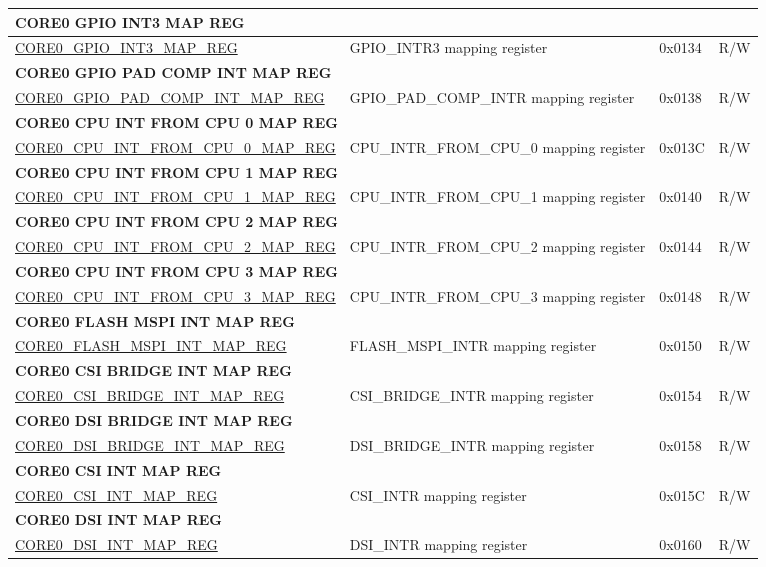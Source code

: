 \begin{longtable}{ | p{7.5cm} | p{7.2cm} | p{1.3cm} | p{1cm} | }
\multicolumn{4}{|l|}{\textbf{CORE0 GPIO INT3 MAP REG}} \\ \hline
\hyperref[regdesc:CORE0GPIOINT3MAPREG]{CORE0\_GPIO\_INT3\_MAP\_REG} & GPIO\_INTR3 mapping register & 0x0134 & R/W \\ \hline
\multicolumn{4}{|l|}{\textbf{CORE0 GPIO PAD COMP INT MAP REG}} \\ \hline
\hyperref[regdesc:CORE0GPIOPADCOMPINTMAPREG]{CORE0\_GPIO\_PAD\_COMP\_INT\_MAP\_REG} & GPIO\_PAD\_COMP\_INTR mapping register & 0x0138 & R/W \\ \hline
\multicolumn{4}{|l|}{\textbf{CORE0 CPU INT FROM CPU 0 MAP REG}} \\ \hline
\hyperref[regdesc:CORE0CPUINTFROMCPU0MAPREG]{CORE0\_CPU\_INT\_FROM\_CPU\_0\_MAP\_REG} & CPU\_INTR\_FROM\_CPU\_0 mapping register & 0x013C & R/W \\ \hline
\multicolumn{4}{|l|}{\textbf{CORE0 CPU INT FROM CPU 1 MAP REG}} \\ \hline
\hyperref[regdesc:CORE0CPUINTFROMCPU1MAPREG]{CORE0\_CPU\_INT\_FROM\_CPU\_1\_MAP\_REG} & CPU\_INTR\_FROM\_CPU\_1 mapping register & 0x0140 & R/W \\ \hline
\multicolumn{4}{|l|}{\textbf{CORE0 CPU INT FROM CPU 2 MAP REG}} \\ \hline
\hyperref[regdesc:CORE0CPUINTFROMCPU2MAPREG]{CORE0\_CPU\_INT\_FROM\_CPU\_2\_MAP\_REG} & CPU\_INTR\_FROM\_CPU\_2 mapping register & 0x0144 & R/W \\ \hline
\multicolumn{4}{|l|}{\textbf{CORE0 CPU INT FROM CPU 3 MAP REG}} \\ \hline
\hyperref[regdesc:CORE0CPUINTFROMCPU3MAPREG]{CORE0\_CPU\_INT\_FROM\_CPU\_3\_MAP\_REG} & CPU\_INTR\_FROM\_CPU\_3 mapping register & 0x0148 & R/W \\ \hline
\multicolumn{4}{|l|}{\textbf{CORE0 FLASH MSPI INT MAP REG}} \\ \hline
\hyperref[regdesc:CORE0FLASHMSPIINTMAPREG]{CORE0\_FLASH\_MSPI\_INT\_MAP\_REG} & FLASH\_MSPI\_INTR mapping register & 0x0150 & R/W \\ \hline
\multicolumn{4}{|l|}{\textbf{CORE0 CSI BRIDGE INT MAP REG}} \\ \hline
\hyperref[regdesc:CORE0CSIBRIDGEINTMAPREG]{CORE0\_CSI\_BRIDGE\_INT\_MAP\_REG} & CSI\_BRIDGE\_INTR mapping register & 0x0154 & R/W \\ \hline
\multicolumn{4}{|l|}{\textbf{CORE0 DSI BRIDGE INT MAP REG}} \\ \hline
\hyperref[regdesc:CORE0DSIBRIDGEINTMAPREG]{CORE0\_DSI\_BRIDGE\_INT\_MAP\_REG} & DSI\_BRIDGE\_INTR mapping register & 0x0158 & R/W \\ \hline
\multicolumn{4}{|l|}{\textbf{CORE0 CSI INT MAP REG}} \\ \hline
\hyperref[regdesc:CORE0CSIINTMAPREG]{CORE0\_CSI\_INT\_MAP\_REG} & CSI\_INTR mapping register & 0x015C & R/W \\ \hline
\multicolumn{4}{|l|}{\textbf{CORE0 DSI INT MAP REG}} \\ \hline
\hyperref[regdesc:CORE0DSIINTMAPREG]{CORE0\_DSI\_INT\_MAP\_REG} & DSI\_INTR mapping register & 0x0160 & R/W \\ \hline


\end{longtable}
